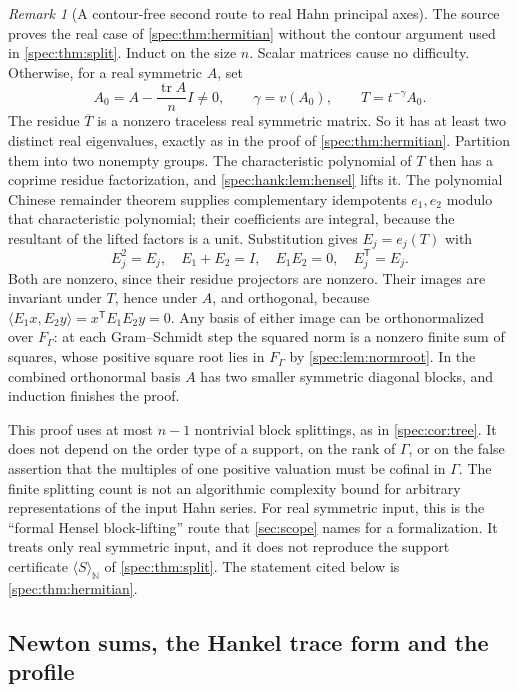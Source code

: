 \documentclass[11pt,a4paper]{article}
\numberwithin{equation}{section}
\theoremstyle{definition}
\theoremstyle{remark}
\newtheorem{remark}[remark]{Remark}
\newcommand{\N}{\mathbb N}
\newcommand{\tr}{\operatorname{tr}}
\begin{document}
\begin{remark}[A contour-free second route to real Hahn principal axes]
\label{spec:hank:rem:hensel}
The source proves the real case of \cref{spec:thm:hermitian} without the
contour argument used in \cref{spec:thm:split}. Induct on the size $n$.
Scalar matrices cause no difficulty. Otherwise, for a real symmetric $A$, set
\[
 A_0=A-\frac{\tr A}{n}I\ne0,
 \qquad \gamma=v(A_0),
 \qquad T=t^{-\gamma}A_0.
\]
The residue $\overline T$ is a nonzero traceless real symmetric matrix. So it
has at least two distinct real eigenvalues, exactly as in the proof of
\cref{spec:thm:hermitian}. Partition them into two nonempty groups. The
characteristic polynomial of $T$ then has a coprime residue factorization,
and \cref{spec:hank:lem:hensel} lifts it. The polynomial Chinese remainder
theorem supplies complementary idempotents $e_1,e_2$ modulo that
characteristic polynomial; their coefficients are integral, because the
resultant of the lifted factors is a unit. Substitution gives $E_j=e_j(T)$
with
\[
 E_j^2=E_j,
 \quad E_1+E_2=I,
 \quad E_1E_2=0,
 \quad E_j^{\mathsf T}=E_j.
\]
Both are nonzero, since their residue projectors are nonzero. Their images
are invariant under $T$, hence under $A$, and orthogonal, because
$\langle E_1x,E_2y\rangle=x^{\mathsf T}E_1E_2y=0$. Any basis of either image can
be orthonormalized over $F_\Gamma$: at each Gram--Schmidt step the squared norm
is a nonzero finite sum of squares, whose positive square root lies in
$F_\Gamma$ by \cref{spec:lem:normroot}. In the combined orthonormal basis $A$
has two smaller symmetric diagonal blocks, and induction finishes the proof.

This proof uses at most $n-1$ nontrivial block splittings, as in
\cref{spec:cor:tree}. It does not depend on the order type of a support, on
the rank of $\Gamma$, or on the false assertion that the multiples of one
positive valuation must be cofinal in $\Gamma$. The finite splitting count is
not an algorithmic complexity bound for arbitrary representations of the
input Hahn series. For real symmetric input, this is the ``formal Hensel
block-lifting'' route that \cref{sec:scope} names for a formalization. It
treats only real symmetric input, and it does not reproduce the support
certificate $\langle S\rangle_\N$ of \cref{spec:thm:split}. The statement
cited below is \cref{spec:thm:hermitian}.
\end{remark}

\subsection{Newton sums, the Hankel trace form and the profile}
\label{spec:hank:sub:hankel}
\end{document}
